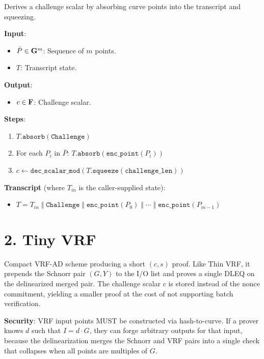 \documentclass[
]{article}
\providecommand{\tightlist}{%
  \setlength{\itemsep}{0pt}\setlength{\parskip}{0pt}}
\begin{document}
Derives a challenge scalar by absorbing curve points into the transcript
and squeezing.

\textbf{Input}:

\begin{itemize}
\tightlist
\item
  \(\bar{P} \in \bold{G}^m\): Sequence of \(m\) points.
\item
  \(T\): Transcript state.
\end{itemize}

\textbf{Output}:

\begin{itemize}
\tightlist
\item
  \(c \in \bold{F}\): Challenge scalar.
\end{itemize}

\textbf{Steps}:

\begin{enumerate}
\def\labelenumi{\arabic{enumi}.}
\tightlist
\item
  \(T.\texttt{absorb}(\texttt{Challenge})\)
\item
  For each \(P_i\) in \(\bar{P}\):
  \(T.\texttt{absorb}(\texttt{enc\_point}(P_i))\)
\item
  \(c \gets \texttt{dec\_scalar\_mod}(T.\texttt{squeeze}(\texttt{challenge\_len}))\)
\end{enumerate}

\textbf{Transcript} (where \(T_{in}\) is the caller-supplied state):

\begin{itemize}
\tightlist
\item
  \(T = T_{in} \;\Vert\; \texttt{Challenge} \;\Vert\; \texttt{enc\_point}(P_0) \;\Vert\; \cdots \;\Vert\; \texttt{enc\_point}(P_{m-1})\)
\end{itemize}

\section{2. Tiny VRF}\label{tiny-vrf}

Compact VRF-AD scheme producing a short \((c, s)\) proof. Like Thin VRF,
it prepends the Schnorr pair \((G, Y)\) to the I/O list and proves a
single DLEQ on the delinearized merged pair. The challenge scalar \(c\)
is stored instead of the nonce commitment, yielding a smaller proof at
the cost of not supporting batch verification.

\textbf{Security}: VRF input points MUST be constructed via
hash-to-curve. If a prover knows \(d\) such that \(I = d \cdot G\), they
can forge arbitrary outputs for that input, because the delinearization
merges the Schnorr and VRF pairs into a single check that collapses when
all points are multiples of \(G\).
\end{document}
